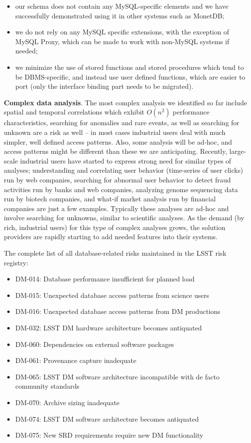 \documentclass[DM,toc]{lsstdoc}
\begin{document}
\begin{itemize}
\item
  our schema does not contain any MySQL-specific elements and we have
  successfully demonstrated using it in other systems such as MonetDB;
\item
  we do not rely on any MySQL specific extensions, with the exception of
  MySQL Proxy, which can be made to work with non-MySQL systems if
  needed;
\item
  we minimize the use of stored functions and stored procedures which
  tend to be DBMS-specific, and instead use user defined functions,
  which are easier to port (only the interface binding part needs to be
  migrated).
\end{itemize}

\textbf{Complex data analysis}. The most complex analysis we identified
so far include spatial and temporal correlations which exhibit
\(O(n^2)\) performance characteristics, searching for anomalies and rare
events, as well as searching for unknown are a risk as well -- in most
cases industrial users deal with much simpler, well defined access
patterns. Also, some analysis will be ad-hoc, and access patterns might
be different than these we are anticipating. Recently, large-scale
industrial users have started to express strong need for similar types of
analyses; understanding and correlating user behavior (time-series of
user clicks) run by web companies, searching for abnormal user behavior
to detect fraud activities run by banks and web companies, analyzing
genome sequencing data run by biotech companies, and what-if market
analysis run by financial companies are just a few examples. Typically
these analyses are ad-hoc and involve searching for unknowns, similar to
scientific analyses. As the demand (by rich, industrial users) for this
type of complex analyses grows, the solution providers are rapidly
starting to add needed features into their systems.

The complete list of all database-related risks maintained in the LSST
risk registry:

\begin{itemize}
\item
  DM-014: Database performance insufficient for planned load
\item
  DM-015: Unexpected database access patterns from science users
\item
  DM-016: Unexpected database access patterns from DM productions
\item
  DM-032: LSST DM hardware architecture becomes antiquated
\item
  DM-060: Dependencies on external software packages
\item
  DM-061: Provenance capture inadequate
\item
  DM-065: LSST DM software architecture incompatible with de facto
  community standards
\item
  DM-070: Archive sizing inadequate
\item
  DM-074: LSST DM software architecture becomes antiquated
\item
  DM-075: New SRD requirements require new DM functionality
\end{itemize}
\end{document}

